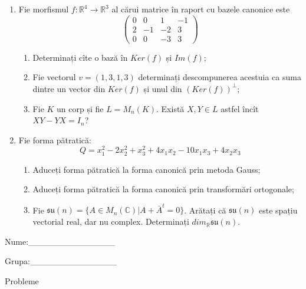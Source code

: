 \documentclass{article}
\begin{document}
\begin{enumerate}
 \item Fie morfismul $f:\mathbb{R}^4 \to \mathbb{R}^3$ al cărui matrice în raport cu bazele canonice este
$$\begin{pmatrix}
0&0&1&-1\\
2&-1&-2&3\\
0&0&-3&3
\end{pmatrix}$$

\begin{enumerate}
\item Determinați cîte o bază în $Ker(f)$ și $Im(f)$;
\item Fie vectorul $v=(1,3,1,3)$ determinați descompunerea acestuia ca suma dintre un vector din $Ker(f)$ și unul din $(Ker(f))^\perp$;
\item Fie $K$ un corp și fie $L=M_n(K)$. Există $X,Y \in L$ astfel încît $XY-YX=I_n$?  
\end{enumerate}
\item Fie forma pătratică:
$$Q= x_1^2-2x_2^2+x_3^2+4x_1x_2-10x_1x_3+4x_2x_3$$

\begin{enumerate}
\item Aduceți forma pătratică la forma canonică prin metoda Gauss;
\item Aduceți forma pătratică la forma canonică prin transformări ortogonale;
\item Fie $\mathfrak{su}(n)=\{ A \in M_n(\mathbb{C}) | A+\bar{A}^t=0\}$. Arătați că $\mathfrak{su}(n)$ este spațiu vectorial real, dar nu complex.
Determinați $dim_{\mathbb{R}}\mathfrak{su}(n)$.
\end{enumerate}
\end{enumerate}
\newpage
\begin{flushright}
Nume:\_\_\_\_\_\_\_\_\_\_\_\_\_\_
 
 
Grupa:\_\_\_\_\_\_\_\_\_\_\_\_\_\_
\end{flushright}
\begin{center}
\vspace{2cm}
{\Large Probleme}
\vspace{2cm}
\end{center}
\end{document}
